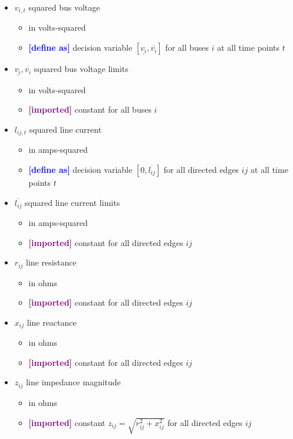 \documentclass{article}
\newcommand{\lo}[1]{\underline{#1}}
\newcommand{\hi}[1]{\overline{#1}}
\newcommand{\define}{\textcolor{blue}{\textbf{[define as] }}}
\newcommand{\imported}{\textcolor{purple}{\textbf{[imported] }}}
\begin{document}
\begin{itemize}
\item $v_{i,t}$ squared bus voltage
  \begin{itemize}
  \item in volts-squared
  \item \define decision variable $[\lo{v_i}, \hi{v_i}]$ for all buses $i$ at
    all time points $t$
  \end{itemize}

\item $\lo{v_{i}}, \hi{v_{i}}$ squared bus voltage limits
  \begin{itemize}
  \item in volts-squared
  \item \imported constant for all buses $i$
  \end{itemize}

\item $l_{ij,t}$ squared line current
  \begin{itemize}
  \item in amps-squared
  \item \define decision variable $[0, \hi{l_{ij}}]$ for all directed edges $ij$
    at all time points $t$
  \end{itemize}

\item $\hi{l_{ij}}$ squared line current limits
  \begin{itemize}
  \item in amps-squared
  \item \imported constant for all directed edges $ij$
  \end{itemize}

\item $r_{ij}$ line resistance
  \begin{itemize}
  \item in ohms
  \item \imported constant for all directed edges $ij$
  \end{itemize}

\item $x_{ij}$ line reactance
  \begin{itemize}
  \item in ohms
  \item \imported constant for all directed edges $ij$
  \end{itemize}

\item $z_{ij}$ line impedance magnitude
  \begin{itemize}
  \item in ohms
  \item \imported constant $z_{ij} = \sqrt{r^2_{ij} + x^2_{ij}}$ for all
    directed edges $ij$
  \end{itemize}


\end{itemize}
\end{document}
